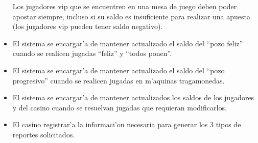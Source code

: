 \begin{itemize}
 Los jugadores vip que se encuentren en una mesa de juego deben poder apostar siempre, incluso si su saldo es insuficiente para realizar una apuesta (los jugadores vip pueden tener saldo negativo).

\item {}  

 El sistema se encargar'a de mantener actualizado el saldo del ``pozo feliz'' cuando se realicen jugadas ``feliz'' y ``todos ponen''.
 
\item {}  

 El sistema se encargar'a de mantener actualizado el saldo del ``pozo progresivo'' cuando se realicen jugadas en m'aquinas tragamonedas.

\item {}  

 El sistema se encargar'a de mantener actualizados los saldos de los jugadores y del casino cuando se resuelvan jugadas que requieran modificarlos.

\item {} 
 
 El casino registrar'a la informaci'on necesaria para generar los 3 tipos de reportes solicitados.

\end{itemize}



